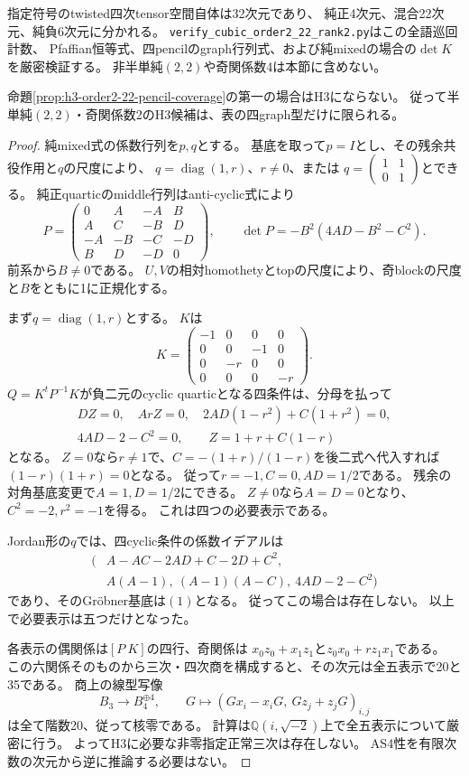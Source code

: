 指定符号のtwisted四次tensor空間自体は32次元であり、
純正4次元、混合22次元、純負6次元に分かれる。
\texttt{verify\_cubic\_order2\_22\_rank2.py}はこの全語巡回計数、
Pfaffian恒等式、四pencilのgraph行列式、および純mixedの場合の$\det K$を厳密検証する。
非半単純$(2,2)$や奇関係数4は本節に含めない。

\begin{theorem}\label{thm:h3-order2-22-pure-exclusion}
命題\ref{prop:h3-order2-22-pencil-coverage}の第一の場合はH3にならない。
従って半単純$(2,2)$・奇関係数2のH3候補は、表の四graph型だけに限られる。
\end{theorem}
\begin{proof}
純mixed式の係数行列を$p,q$とする。
基底を取って$p=I$とし、その残余共役作用と$q$の尺度により、
$q=\operatorname{diag}(1,r)$、$r\ne0$、または
$q=\left(\begin{smallmatrix}1&1\\0&1\end{smallmatrix}\right)$とできる。
純正quarticのmiddle行列はanti-cyclic式により
\[
 P=\begin{pmatrix}
 0&A&-A&B\\ A&C&-B&D\\-A&-B&-C&-D\\B&D&-D&0
 \end{pmatrix},\qquad
 \det P=-B^2(4AD-B^2-C^2).
\]
前系から$B\ne0$である。
$U,V$の相対homothetyとtopの尺度により、奇blockの尺度と$B$をともに1に正規化する。

まず$q=\operatorname{diag}(1,r)$とする。
$K$は
\[
 K=\begin{pmatrix}-1&0&0&0\\0&0&-1&0\\0&-r&0&0\\0&0&0&-r\end{pmatrix}.
\]
$Q=K^tP^{-1}K$が負二元のcyclic quarticとなる四条件は、分母を払って
\begin{gather*}
 D Z=0,\quad ArZ=0,\quad
 2AD(1-r^2)+C(1+r^2)=0,\\
 4AD-2-C^2=0,\qquad Z=1+r+C(1-r)
\end{gather*}
となる。
$Z=0$なら$r\ne1$で、$C=-(1+r)/(1-r)$を後二式へ代入すれば
$(1-r)(1+r)=0$となる。
従って$r=-1,C=0,AD=1/2$である。
残余の対角基底変更で$A=1,D=1/2$にできる。
$Z\ne0$なら$A=D=0$となり、$C^2=-2,r^2=-1$を得る。
これは四つの必要表示である。

Jordan形の$q$では、四cyclic条件の係数イデアルは
\[
\begin{split}
 (&A-AC-2AD+C-2D+C^2,\\
 &A(A-1),\ (A-1)(A-C),\ 4AD-2-C^2)
\end{split}
\]
であり、そのGr\"obner基底は$(1)$となる。
従ってこの場合は存在しない。
以上で必要表示は五つだけとなった。

各表示の偶関係は$[P\ K]$の四行、奇関係は
$x_0z_0+x_1z_1$と$z_0x_0+r z_1x_1$である。
この六関係そのものから三次・四次商を構成すると、その次元は全五表示で20と35である。
商上の線型写像
\[
 B_3\longrightarrow B_4^{\oplus4},\qquad
 G\longmapsto(Gx_i-x_iG,\ Gz_j+z_jG)_{i,j}
\]
は全て階数20、従って核零である。
計算は$\mathbb Q(i,\sqrt{-2})$上で全五表示について厳密に行う。
よってH3に必要な非零指定正常三次は存在しない。
AS4性を有限次数の次元から逆に推論する必要はない。
\end{proof}

